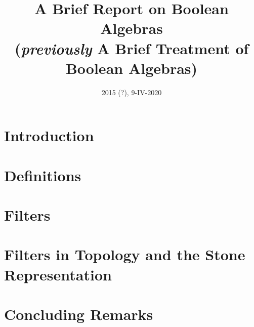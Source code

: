 \documentclass[11pt]{article}
\title{A Brief Report on Boolean Algebras \\ \small{(\textit{previously} A Brief Treatment of Boolean Algebras)}}
\author{}
\date{2015 (?), 9-IV-2020} %
\begin{document}
\maketitle

\section{Introduction}


\section{Definitions}


\section{Filters}


\section{Filters in Topology and the Stone Representation}


\section{Concluding Remarks}


\begin{thebibliography}{9}

\end{thebibliography}
\end{document}
